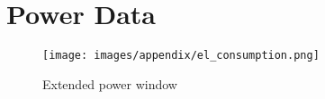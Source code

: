 \chapter{Power Data}
\begin{figure}
    \centering
    \texttt{[image: images/appendix/el\_consumption.png]}
    \caption{Extended power window}\label{app:some-unique-name}
\end{figure}
